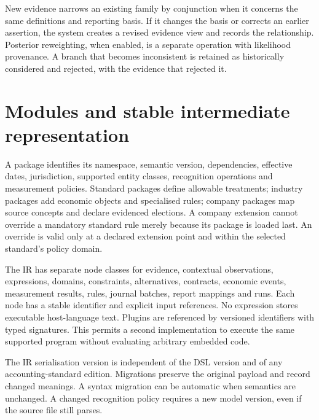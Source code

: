 New evidence narrows an existing family by conjunction when it concerns the
same definitions and reporting basis. If it changes the basis or corrects an
earlier assertion, the system creates a revised evidence view and records the
relationship. Posterior reweighting, when enabled, is a separate operation
with likelihood provenance. A branch that becomes inconsistent is retained
as historically considered and rejected, with the evidence that rejected it.

\section{Modules and stable intermediate representation}

A package identifies its namespace, semantic version, dependencies, effective
dates, jurisdiction, supported entity classes, recognition operations and
measurement policies. Standard packages define allowable treatments; industry
packages add economic objects and specialised rules; company packages map
source concepts and declare evidenced elections. A company extension cannot
override a mandatory standard rule merely because its package is loaded last.
An override is valid only at a declared extension point and within the selected
standard's policy domain.

The IR has separate node classes for evidence, contextual observations,
expressions, domains, constraints, alternatives, contracts, economic events,
measurement results, rules, journal batches, report mappings and runs.
Each node has a stable identifier and explicit input references. No expression
stores executable host-language text. Plugins are referenced by versioned
identifiers with typed signatures. This permits a second implementation to
execute the same supported program without evaluating arbitrary embedded code.

The IR serialisation version is independent of the DSL version and of any
accounting-standard edition. Migrations preserve the original payload and
record changed meanings. A syntax migration can be automatic when semantics
are unchanged. A changed recognition policy requires a new model version,
even if the source file still parses.

